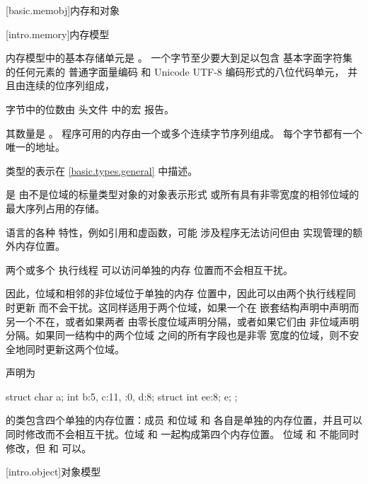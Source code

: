 [basic.memobj]{内存和对象}

[intro.memory]{内存模型}

\pnum
{}%
\Cpp{} 内存模型中的基本存储单元是
。
一个字节至少要大到足以包含
基本字面字符集 的任何元素的
普通字面量编码
%
和 Unicode
%
UTF-8 编码形式的八位代码单元，
并且由连续的位序列组成，
\begin{footnote}
字节中的位数由
头文件  中的宏
 报告。
\end{footnote}
其数量是 。
\Cpp{} 程序可用的内存由一个或多个连续字节序列组成。
每个字节都有一个唯一的地址。

\pnum
\begin{note}
类型的表示在 \ref{basic.types.general} 中描述。
\end{note}

\pnum
{} 是
由不是位域的标量类型对象的对象表示形式
或所有具有非零宽度的相邻位域的最大序列占用的存储。
\begin{note}
语言的各种
特性，例如引用和虚函数，可能
涉及程序无法访问但由
实现管理的额外内存位置。
\end{note}
两个或多个
执行线程 可以访问单独的内存
位置而不会相互干扰。

\pnum
\begin{note}
因此，位域和相邻的非位域位于单独的内存
位置中，因此可以由两个执行线程同时更新
而不会干扰。这同样适用于两个位域，如果一个在
嵌套结构声明中声明而另一个不在，或者如果两者
由零长度位域声明分隔，或者如果它们由
非位域声明分隔。如果同一结构中的两个位域
之间的所有字段也是非零
宽度的位域，则不安全地同时更新这两个位域。
\end{note}

\pnum
\begin{example}
声明为
\begin{codeblock}
struct {
  char a;
  int b:5,
  c:11,
  :0,
  d:8;
  struct {int ee:8;} e;
};
\end{codeblock}
的类包含四个单独的内存位置：成员  和位域
 和  各自是单独的内存位置，并且可以
同时修改而不会相互干扰。位域
 和  一起构成第四个内存位置。
位域  和  不能同时修改，但
 和  可以。
\end{example}

[intro.object]{对象模型}

